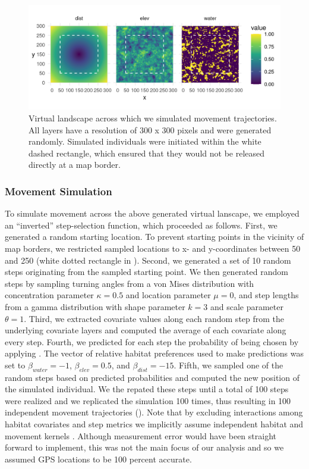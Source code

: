 \documentclass[abstract=on,10pt,a4paper,bibliography=totocnumbered]{article}
\begin{document}
\begin{figure}
  \begin{center}
  \includegraphics[width = \textwidth]{99_Covariates.png}
  \caption{Virtual landscape across which we simulated movement trajectories.
  All layers have a resolution of 300 x 300 pixels and were generated randomly.
  Simulated individuals were initiated within the white dashed rectangle, which
  ensured that they would not be released directly at a map border.}
  \label{Covariates}
  \end{center}
\end{figure}

\subsubsection{Movement Simulation}
To simulate movement across the above generated virtual lanscape, we employed an
``inverted'' step-selection function, which proceeded as follows. First, we
generated a random starting location. To prevent starting points in the vicinity
of map borders, we restricted sampled locations to x- and y-coordinates between
50 and 250 (white dotted rectangle in ). Second, we generated a
set of 10 random steps originating from the sampled starting point. We then
generated random steps by sampling turning angles from a von Mises distribution
with concentration parameter \(\kappa = 0.5\) and location parameter \( \mu = 0
\), and step lengths from a gamma distribution with shape parameter \(k = 3 \)
and scale parameter \(\theta = 1\). Third, we extracted covariate values along
each random step from the underlying covariate layers and computed the average
of each covariate along every step. Fourth, we predicted for each step the
probability of being chosen by applying . The vector of relative
habitat preferences used to make predictions was set to \(\beta_{water} = -1\),
\(\beta_{elev} = 0.5\), and \(\beta_{dist} = -15\). Fifth, we sampled one of the
random steps based on predicted probabilities and computed the new position of
the simulated individual. We the repated these steps until a total of 100 steps
were realized and we replicated the simulation 100 times, thus resulting in 100
independent movement trajectories (). Note that by excluding
interactions among habitat covariates and step metrics we implicitly assume
independent habitat and movement kernels \citep{Avgar.2016}. Although
measurement error would have been straight forward to implement, this was not
the main focus of our analysis and so we assumed GPS locations to be 100 percent
accurate.
\end{document}

